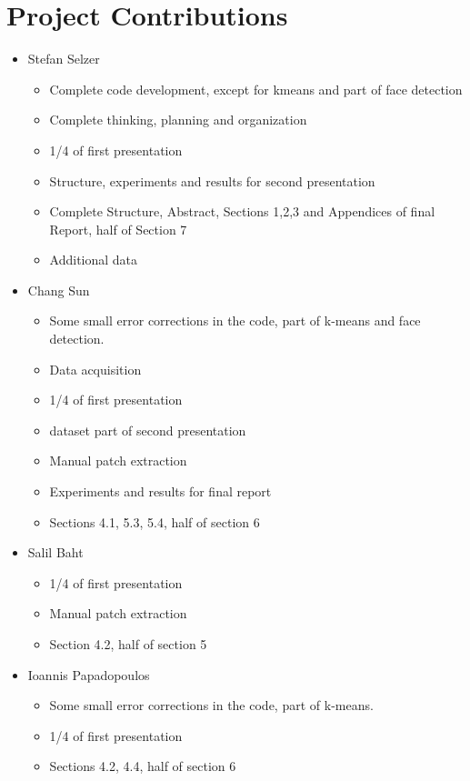 \section{Project Contributions}

\begin{itemize}
	\item Stefan Selzer
	\begin{itemize}
	\item Complete code development, except for kmeans and part of face detection
	\item Complete thinking, planning and organization
	\item 1/4 of first presentation
	\item Structure, experiments and results for second presentation
	\item Complete Structure, Abstract, Sections 1,2,3 and Appendices of final Report, half of Section 7
	\item Additional data
	\end{itemize}
	\item Chang Sun
	\begin{itemize}
	\item Some small error corrections in the code, part of k-means and face detection.
	\item Data acquisition
	\item 1/4 of first presentation
	\item dataset part of second presentation
	\item Manual patch extraction
	\item Experiments and results for final report
	\item Sections 4.1, 5.3, 5.4, half of section 6
	\end{itemize}
	\item Salil Baht
	\begin{itemize}
	\item 1/4 of first presentation
	\item Manual patch extraction
	\item Section 4.2, half of section 5
	\end{itemize}
	\item Ioannis Papadopoulos
	\begin{itemize}
	\item Some small error corrections in the code, part of k-means.
	\item 1/4 of first presentation
	\item Sections 4.2, 4.4, half of section 6
	\end{itemize}
\end{itemize}
